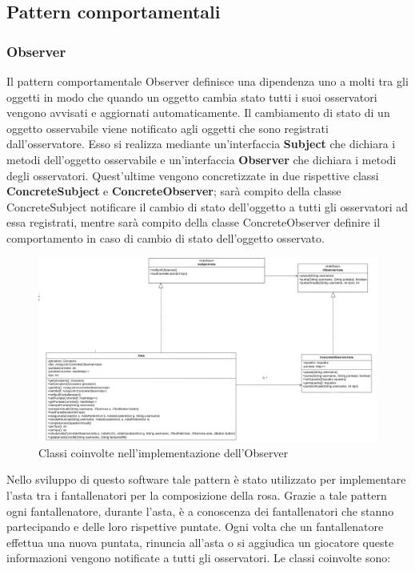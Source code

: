\documentclass[12pt,a4paper]{article}
\begin{document}
\subsection{Pattern comportamentali}
\subsubsection{Observer}
Il pattern comportamentale Observer definisce una dipendenza uno a molti tra gli oggetti in modo che quando un oggetto cambia stato tutti i suoi osservatori vengono avvisati e aggiornati automaticamente. Il cambiamento di stato di un oggetto osservabile viene notificato agli oggetti che sono registrati dall'osservatore. Esso si realizza mediante un'interfaccia \textbf{Subject} che dichiara i metodi dell'oggetto osservabile e un'interfaccia \textbf{Observer} che dichiara i metodi degli osservatori. Quest'ultime vengono concretizzate in due rispettive classi \textbf{ConcreteSubject} e \textbf{ConcreteObserver}; sarà compito della classe  ConcreteSubject notificare il cambio di stato dell'oggetto a tutti gli osservatori ad essa registrati, mentre sarà compito della classe ConcreteObserver definire il comportamento in caso di cambio di stato dell'oggetto osservato.
\begin{figure}[h]
\centering
\includegraphics[width=18 cm ,keepaspectratio]{Observer.png}
\caption{Classi coinvolte nell'implementazione dell'Observer}
\end{figure}
\newline
Nello sviluppo di questo software tale pattern è stato utilizzato per implementare l'asta tra i fantallenatori  per la composizione della rosa. Grazie a tale pattern ogni fantallenatore, durante l'asta, è a conoscenza dei fantallenatori  che stanno partecipando e delle loro rispettive puntate. Ogni volta che un fantallenatore effettua una nuova puntata, rinuncia all'asta o si aggiudica un giocatore queste informazioni vengono notificate a tutti gli osservatori.  Le classi coinvolte sono:
\end{document}
